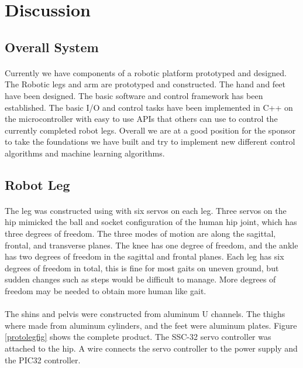 \documentclass[titlepage,letterpaper,12pt]{article}
\begin{document}
\section{Discussion}
\subsection{Overall System}
\paragraph{}Currently we have components of a robotic platform prototyped and
designed. The Robotic legs and arm are prototyped and constructed. The hand and
feet have been designed. The basic software and control framework has been
established. The basic I/O and control tasks have been implemented in C++ on the
microcontroller with easy to use APIs that others can use to control the
currently completed robot legs. Overall we are at a good position for the
sponsor to take the foundations we have built and try to implement new different
control algorithms and machine learning algorithms. 

\subsection{Robot Leg}
\paragraph{}The leg was constructed using with six servos on each leg. Three
servos on the hip mimicked the ball and socket configuration of the human hip
joint, which has three degrees of freedom\cite{SiasJr1990}. The three modes of
motion are along the sagittal, frontal, and transverse planes\cite{Fiscell2005}.
The knee has one degree of freedom, and the ankle has two degrees of freedom in
the sagittal and frontal planes. Each leg has six degrees of freedom in total,
this is fine for most gaits on uneven ground, but sudden changes such as steps
would be difficult to manage\cite{SiasJr1990}. More degrees of freedom may be
needed to obtain more human like gait\cite{SiasJr1990}.

\paragraph{}The shins and pelvis were constructed from aluminum U channels. The
thighs where made from aluminum cylinders, and the feet were aluminum plates.
Figure \ref{protolegfig} shows the complete product. The SSC-32 servo controller
was attached to the hip. A wire connects the servo controller to the power
supply and the PIC32 controller. 
\end{document}
